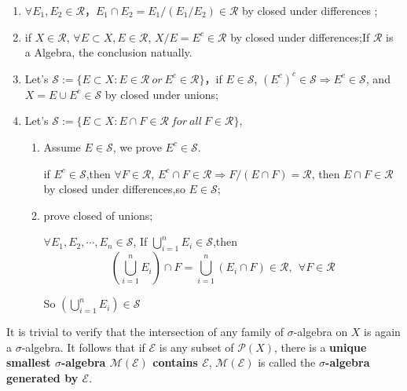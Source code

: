 \begin{mdframed}[backgroundcolor=gray!10,linewidth=0pt]
    \begin{pf}
        \begin{enumerate}
            \item $\forall E_1,E_2\in \mathcal{R}$，$E_1\cap E_2 = E_1/(E_1/E_2)\in \mathcal{R}$ by closed under differences ;
            \item if $X\in \mathcal{R}$, $\forall E\subset X,E\in \mathcal{R}$, $X/E=E^c\in \mathcal{R}$ by closed under differences;If $\mathcal{R}$ is a Algebra, the conclusion natually.
            \item Let's $\mathcal{S}:=\{E\subset X : E\in \mathcal{R}\ or\ E^c\in \mathcal{R}\}$，if $E\in \mathcal{S}$, $(E^c)^c\in \mathcal{S}\Rightarrow E^c\in \mathcal{S}$, and $X=E\cup E^c\in \mathcal{S}$ by closed under unions;
            \item Let's $\mathcal{S}:=\{E\subset X : E\cap F\in \mathcal{R}\ for\ all\ F\in \mathcal{R}\}$, 
            \begin{enumerate}
                \item Assume $E\in \mathcal{S}$, we prove $E^c\in \mathcal{S}$.
                
                if $E^c\in \mathcal{S}$,then $\forall F\in \mathcal{R}$, $E^c\cap F\in \mathcal{R}\Rightarrow F/(E\cap F)=\mathcal{R}$, then $E\cap F\in \mathcal{R}$ by closed under differences,so $E\in \mathcal{S}$;
                
                \item prove closed of unions; 
                
                $\forall E_1,E_2,\cdots,E_n\in \mathcal{S}$, If $\bigcup^n_{i=1} E_i\in \mathcal{S}$,then
                \begin{equation}
                    (\bigcup^n_{i=1} E_i)\cap F=\bigcup^n_{i=1} (E_i\cap F)\in \mathcal{R},\ \ \forall F\in \mathcal{R}
                \end{equation}

                So $(\bigcup^n_{i=1} E_i)\in \mathcal{S}$
            \end{enumerate}
        \end{enumerate}
    \end{pf}
\end{mdframed}

It is trivial to verify that the intersection of any family of $\sigma$-algebra on $X$ is again a $\sigma$-algebra. It follows that if $\mathcal{E}$ is any subset of $\mathcal{P}(X)$,
there is a \textbf{unique smallest $\sigma$-algebra $\mathcal{M}(\mathcal{E})$ contains $\mathcal{E}$}, $\mathcal{M}(\mathcal{E})$ is called the \textbf{$\sigma$-algebra generated by $\mathcal{E}$}.


